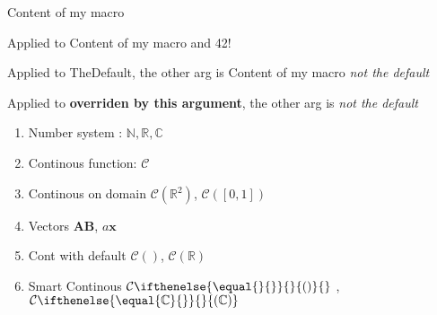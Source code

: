 \documentclass{article}
\newcommand{\mymacro}{Content of my macro }
\newcommand{\macroWithArgs}[2]{Applied to #1 and #2!}
\newcommand{\macroWithDefault}[2][TheDefault]{Applied to #1, the other arg is #2}
\newcommand{\numn}{\mathbb{N}}
\newcommand{\numr}{\mathbb{R}}
\newcommand{\numc}{\mathbb{C}}
\newcommand{\conc}{\mathcal{C}}
\newcommand{\continousON}[1]{\conc{}(#1)}
\newcommand{\vect}[1]{\mathbf{#1}}
\newcommand{\contDef}[1][{}]{\conc{}(#1)}
\newcommand{\smartCont}[1][{}]{
\conc{}%
\ifthenelse{ \equal{#1}{} }
{} %
{(#1)}
}
\begin{document}
\mymacro{}

\macroWithArgs{\mymacro}{42}

\macroWithDefault{\mymacro}{\emph{not the default}} 

\macroWithDefault[\textbf{overriden by this argument}]
{\emph{not the default}}

\begin{enumerate}
    \item Number system : $\numn, \numr ,\numc $
    \item Continous function: $\conc$
    \item  Continous on domain $\continousON {\numr{}^2}$, $\continousON{[0,1]}$
    \item Vectors $\vect{AB}$, $a \vect{x}$
    \item  Cont with default $\contDef$, $\contDef[\numr]$
    \item Smart Continous $\smartCont{}$ , $\smartCont[\numc]$
\end{enumerate}






\circ
\end{document}
